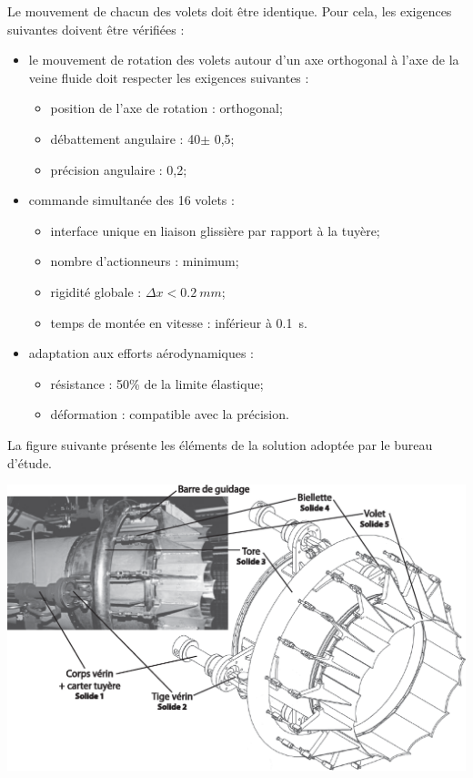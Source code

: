 \documentclass[10pt,fleqn]{article} %
\begin{document}
\begin{multicols}{2}
Le mouvement de chacun des volets doit être identique. Pour cela, les exigences suivantes doivent être vérifiées :
\begin{itemize}
\item le mouvement de rotation des volets autour d'un axe orthogonal à l'axe de la veine fluide doit respecter les exigences suivantes : 
\begin{itemize}
\item position de l'axe de rotation : orthogonal;
\item débattement angulaire : 40\degres $\pm$ 0,5\degres;
\item précision angulaire : 0,2\degres;
\end{itemize}
\item commande simultanée des 16 volets :
\begin{itemize}
\item interface unique en liaison glissière par rapport à la tuyère;
\item nombre d'actionneurs : minimum;
\item rigidité globale : $\Delta x < \SI{0,2}{mm}$;
\item temps de montée en vitesse : inférieur à \SI{0,1}{s}.
\end{itemize}
\item adaptation aux efforts aérodynamiques :
\begin{itemize}
\item résistance : 50\% de la limite élastique;
\item déformation : compatible avec la précision.
\end{itemize}
\end{itemize}


La figure suivante présente les éléments de la solution adoptée par le bureau d'étude.
\begin{center}
\includegraphics[width=\linewidth]{images/fig_02}
\end{center}


\end{multicols}
\end{document}
